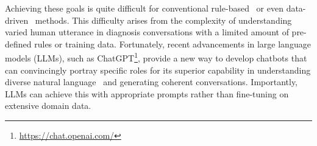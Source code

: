 


Achieving these goals is quite difficult for conventional rule-based~\cite{Medeiros2018UsingCF,Jaiswal2019Virtual} or even data-driven~\cite{yao-etal-2022-d4, Fansi2022DDXPlus, Lin2021Graph} methods. This difficulty arises from the complexity of understanding varied human utterance in diagnosis conversations with a limited amount of pre-defined rules or training data. 
Fortunately, recent advancements in large language models (LLMs), such as ChatGPT\footnote{\url{https://chat.openai.com/}}, provide a new way to develop chatbots that can convincingly portray specific roles for its superior capability in understanding diverse natural language~\cite{Pan2023APE} and generating coherent conversations. Importantly, LLMs can achieve this with appropriate prompts rather than fine-tuning on extensive domain data.



